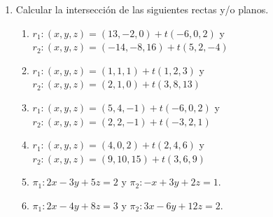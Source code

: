\documentclass[a4paper]{article}
\newcommand{\exercise}{\item}
\begin{document}
\begin{enumerate}
\begin{enumerate} [label=(\alph*)]
		\item  Es paralelo al vector $(2,-1,4)$ y pasa por el punto $P(3,3,1)$.
		\item  Pasa por los puntos $P(4,0,5)$ y $Q(-1,-1,0)$.
		\item  Pasa por los puntos $A(0,1,1)$, $B(1,3,2)$, $C(0,2,-4)$ y $D(1,7,5)$.
		\item  Pasa por los puntos $P(3,-2,0)$ y $Q(1,-1,1)$ y es paralelo al vector $(1,2,2)$.
		\item  Pasa por los puntos $P(3,-2,0)$ y $Q(1,-1,1)$ y es paralelo al vector $(1,2,2)$.
		\item  Es paralelo al plano $\pi: 2x-3y+2z=6$ y pasa por el punto $P(2,1,0)$.
		\item  Es paralelo a las rectas $r_1: (x,y,z)=(1,4,0)+t(5,5,-3)$ y $r_2: (x,y,z)=(-10,2,7)+t(4,0,3)$ y contiene al punto $P(2,2,2)$.
		\item  Es perpendicular a la recta $r: (x,y,z)=(2,-9,7)+t(1,-1,1)$ y pasa por el punto $P(3,1,-3)$.
		\item  Contiene a la recta $r: (x,y,z)=(5,1,0)+t(1,-3,1)$.
		\item Es perpendicular a los planos $\pi_1: 2x-3y+5z=2$ y $\pi_2: -x+3y+2z=1$ e incluye al punto $P(5,1,0)$.
		\item Es perpendicular al planos $\pi: 3x-2y+z=5$ y pasa por $P(4,1,5)$.
		\item  Contiene a la recta $r: (x,y,z)=(2,1,2)+t(0,4,1)$ y al punto $P(1,2,3)$
		\item  Contiene a las rectas $r_1: (x,y,z)=(13,-2,0)+t(-6,0,2)$ y $r_2: (x,y,z)=(-14,-8,16)+t(5,2,-4)$.
	\end{enumerate}
	\exercise Calcular la intersección de las siguientes rectas y/o planos.
	\begin{enumerate} [label=(\alph*)]
		\item $r_1: (x,y,z)=(13,-2,0)+t(-6,0,2)$ y $r_2: (x,y,z)=(-14,-8,16)+t(5,2,-4)$
		\item $r_1: (x,y,z)=(1,1,1)+t(1,2,3)$ y $r_2: (x,y,z)=(2,1,0)+t(3,8,13)$
		\item $r_1: (x,y,z)=(5,4,-1)+t(-6,0,2)$ y $r_2: (x,y,z)=(2,2,-1)+t(-3,2,1)$
		\item $r_1: (x,y,z)=(4,0,2)+t(2,4,6)$ y $r_2: (x,y,z)=(9,10,15)+t(3,6,9)$
		\item $\pi_1: 2x-3y+5z=2$ y $\pi_2: -x+3y+2z=1$.
		\item $\pi_1: 2x-4y+8z=3$ y $\pi_2: 3x-6y+12z=2$.

\end{enumerate}
\end{enumerate}
\end{document}
